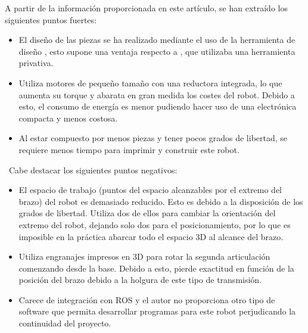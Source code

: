 \begin{itemize}
    A partir de la información proporcionada en este artículo, se han extraído los siguientes puntos fuertes:
    \begin{itemize}
        \item El diseño de las piezas se ha realizado mediante el uso de la herramienta de diseño , esto supone una ventaja respecto 
        a \cite{KRIMPENIS2020103}, que utilizaba una herramienta privativa.
        \item Utiliza motores de pequeño tamaño con una reductora integrada, lo que aumenta su torque y abarata en gran medida los costes 
        del robot. Debido a esto, el consumo de energía es menor pudiendo hacer uso de una electrónica compacta y menos costosa.
        \item Al estar compuesto por menos piezas y tener pocos grados de libertad, se requiere menos tiempo para imprimir y construir este robot.
    \end{itemize}\
    Cabe destacar los siguientes puntos negativos:
    \begin{itemize}
        \item El espacio de trabajo (puntos del espacio alcanzables por el extremo del brazo) del robot es demasiado reducido. Esto es debido 
        a la disposición de los grados de libertad. Utiliza dos de ellos para cambiar la orientación del extremo del robot, dejando solo dos para el 
        posicionamiento, por lo que es imposible en la práctica abarcar todo el espacio 3D al alcance del brazo.
        \item Utiliza engranajes impresos en 3D para rotar la segunda articulación comenzando desde la base. Debido a esto, pierde exactitud en función 
        de la posición del brazo debido a la holgura de este tipo de transmisión.
        \item Carece de integración con \ac{ROS} y el autor no proporciona otro tipo de software que permita desarrollar programas para este robot perjudicando la 
        continuidad del proyecto.
    \end{itemize}\


\end{itemize}
